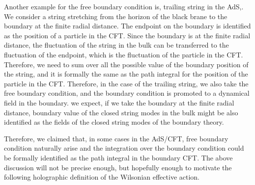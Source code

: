 \documentclass[12pt,epsbox]{article}
\numberwithin{equation}{section}
\begin{document}
Another example for the free boundary condition is, trailing string in the AdS\cite{StochasticdeBoer},\cite{StochasticSon}. We consider a string stretching from the horizon of the black brane to the boundary at the finite radial distance. The endpoint on the boundary is identified as the position of a particle in the CFT. Since the boundary is at the finite radial distance, the fluctuation of the string in the bulk can be transferred to the fluctuation of the endpoint, which is the fluctuation of the particle in the CFT. Therefore, we need to sum over all the possible value of the boundary position of the string, and it is formally the same as the path integral for the position of the particle in the CFT. Therefore, in the case of the trailing string, we also take the free boundary condition, and the boundary condition is promoted to a dynamical field in the boundary. we expect, if we take the boundary at the finite radial distance\cite{VV}, boundary value of the closed string modes in the bulk might be also identified as the fields of the closed string modes of the boundary theory.

Therefore, we claimed that, in some cases in the AdS/CFT, free boundary condition naturally arise and the integration over the boundary condition could be formally identified as the path integral in the boundary CFT. The above discussion will not be precise enough, but hopefully enough to motivate the following holographic definition of the Wilsonian effective action.
\end{document}
